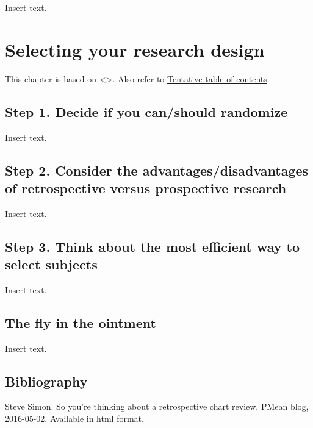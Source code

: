 \documentclass[
  letterpaper,
  DIV=11,
  numbers=noendperiod]{scrreprt}
\begin{document}
Insert text.


\chapter{Selecting your research
design}\label{selecting-your-research-design}

This chapter is based on \textless{}\textgreater. Also refer to
\href{http://www.pmean.com/10/Contents.html}{Tentative table of
contents}.

\section{Step 1. Decide if you can/should
randomize}\label{step-1.-decide-if-you-canshould-randomize}

Insert text.

\section{Step 2. Consider the advantages/disadvantages of retrospective
versus prospective
research}\label{step-2.-consider-the-advantagesdisadvantages-of-retrospective-versus-prospective-research}

Insert text.

\section{Step 3. Think about the most efficient way to select
subjects}\label{step-3.-think-about-the-most-efficient-way-to-select-subjects}

Insert text.

\section{The fly in the ointment}\label{the-fly-in-the-ointment-1}

Insert text.

\section{Bibliography}\label{bibliography}

Steve Simon. So you're thinking about a retrospective chart review.
PMean blog, 2016-05-02. Available in
\href{http://blog.pmean.com/chart-review/}{html format}.

\end{document}
